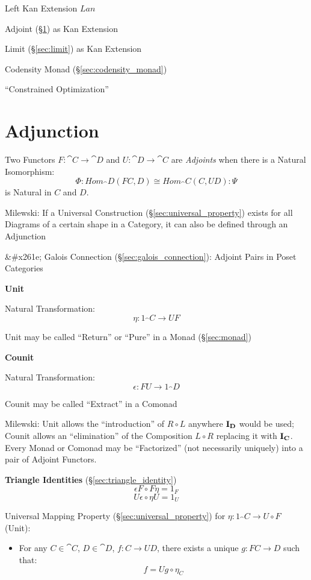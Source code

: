 Left Kan Extension $Lan$

Adjoint (\S\ref{sec:adjunction}) as Kan Extension

Limit (\S\ref{sec:limit}) as Kan Extension

Codensity Monad (\S\ref{sec:codensity_monad})

``Constrained Optimization'' %



\section{Adjunction}\label{sec:adjunction}


Two Functors $F : \cat{C} \rightarrow \cat{D}$ and $U : \cat{D}
\rightarrow \cat{C}$ are \emph{Adjoints} when there is a Natural
Isomorphism:
\[
  \Phi : Hom_\cat{D}(F C,D) \cong Hom_\cat{C}(C,U D) : \Psi
\]
is Natural in $C$ and $D$.


Milewski: If a Universal Construction (\S\ref{sec:universal_property})
exists for all Diagrams of a certain shape in a Category, it can also
be defined through an Adjunction

&#x261e; Galois Connection (\S\ref{sec:galois_connection}): Adjoint
Pairs in Poset Categories


\textbf{Unit}

Natural Transformation:
\[
  \eta : 1_\cat{C} \rightarrow U F
\]

\fist Unit may be called ``Return'' or ``Pure'' in a Monad
(\S\ref{sec:monad})


\textbf{Counit}

Natural Transformation:
\[
  \epsilon : F U \rightarrow 1_\cat{D}
\]

\fist Counit may be called ``Extract'' in a Comonad


Milewski: Unit allows the ``introduction'' of $R \circ L$ anywhere
$\mathbf{I}_\mathbf{D}$ would be used; Counit allows an ``elimination'' of the
Composition $L \circ R$ replacing it with $\mathbf{I}_\mathbf{C}$. Every Monad
or Comonad may be ``Factorized'' (not necessarily uniquely) into a
pair of Adjoint Functors.


\textbf{Triangle Identities} (\S\ref{sec:triangle_identity})
\[
  \epsilon F \circ F \eta = 1_F
\]\[
  U \epsilon \circ \eta U = 1_U
\]


Universal Mapping Property (\S\ref{sec:universal_property}) for $\eta
: 1_\cat{C} \rightarrow U \circ F$ (Unit):
\begin{itemize}
\item For any $C \in \cat{C}$, $D \in \cat{D}$, $f : C
  \rightarrow U D$, there exists a unique $g : FC \rightarrow D$ such
  that:
  \[
    f = U g \circ \eta_C
  \]
\end{itemize}

